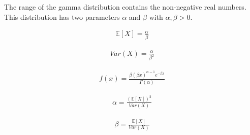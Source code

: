 \documentclass{article}
\begin{document}
\begin{flushleft}
    The range of the gamma distribution contains the non-negative real numbers.
    This distribution has two parameters $\alpha$ and $\beta$ with $\alpha, \beta > 0$.

    \begin{align*}
        \mathbb{E}[X] = \frac{\alpha}{\beta}
    \end{align*}

    \begin{align*}
        Var(X) = \frac{\alpha}{\beta^2}
    \end{align*}

    \begin{align*}
        f(x) = \frac{\beta\left(\beta x\right)^{\alpha-1}e^{-\beta x}}{\Gamma(\alpha)}
    \end{align*}

    \begin{align*}
        \alpha = \frac{(\mathbb{E}[X])^2}{Var(X)}
    \end{align*}

    \begin{align*}
        \beta = \frac{\mathbb{E}[X]}{Var(X)}
    \end{align*}

\end{flushleft}
\end{document}
